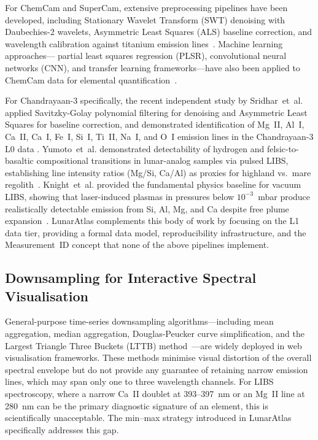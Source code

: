 \documentclass[a4paper,twocolumn,10pt]{article}
\begin{document}
For ChemCam and SuperCam, extensive preprocessing pipelines have been
developed, including Stationary Wavelet Transform (SWT) denoising with
Daubechies-2 wavelets, Asymmetric Least Squares (ALS) baseline
correction, and wavelength calibration against titanium emission
lines~\cite{Anderson2022,Clegg2017}.  Machine learning approaches---
partial least squares regression (PLSR), convolutional neural networks
(CNN), and transfer learning frameworks---have also been applied to
ChemCam data for elemental quantification~\cite{Clegg2017,
Castorena2021,Saeidfirozeh2024}.

For Chandrayaan-3 specifically, the recent independent study by
Sridhar~et~al. applied Savitzky-Golay polynomial filtering for
denoising and Asymmetric Least Squares for baseline correction, and
demonstrated identification of Mg~II, Al~I, Ca~II, Ca~I, Fe~I, Si~I,
Ti~II, Na~I, and O~I emission lines in the Chandrayaan-3 L0 data
\cite{Sridhar2025}.  Yumoto~et~al. demonstrated detectability of
hydrogen and felsic-to-basaltic compositional transitions in
lunar-analog samples via pulsed LIBS, establishing line intensity
ratios (Mg/Si, Ca/Al) as proxies for highland vs.\ mare
regolith~\cite{Yumoto2023}.  Knight~et~al. provided the
fundamental physics baseline for vacuum LIBS, showing that
laser-induced plasmas in pressures below $10^{-3}$~mbar produce
realistically detectable emission from Si, Al, Mg, and Ca despite
free plume expansion~\cite{Knight2000}.
LunarAtlas complements this body of work by focusing on
the L1 data tier, providing a formal data model, reproducibility
infrastructure, and the Measurement~ID concept that none of the
above pipelines implement.

\subsection{Downsampling for Interactive Spectral Visualisation}

General-purpose time-series downsampling algorithms---including mean
aggregation, median aggregation, Douglas-Peucker curve simplification,
and the Largest Triangle Three Buckets (LTTB) method~\cite{
Steinarsson2013}---are widely deployed in web visualisation frameworks.
These methods minimise visual distortion of the overall spectral
envelope but do not provide any guarantee of retaining narrow emission
lines, which may span only one to three wavelength channels.  For LIBS
spectroscopy, where a narrow Ca~II doublet at 393--397~nm or an Mg~II
line at 280~nm can be the primary diagnostic signature of an element,
this is scientifically unacceptable.  The min--max strategy introduced
in LunarAtlas specifically addresses this gap.
\end{document}
